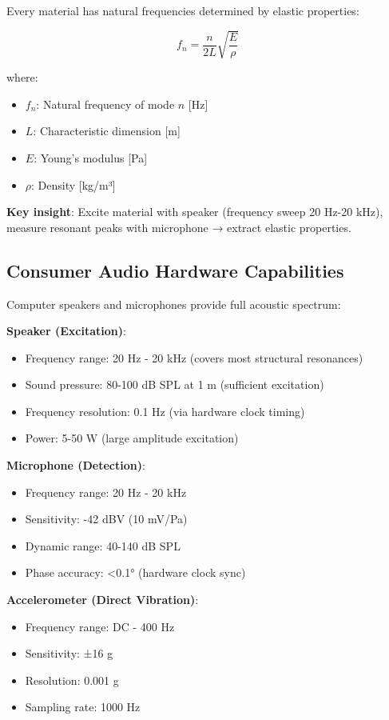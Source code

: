 \documentclass[12pt,a4paper]{article}
\begin{document}
Every material has natural frequencies determined by elastic properties:

\begin{equation}
f_n = \frac{n}{2L}\sqrt{\frac{E}{\rho}}
\end{equation}

where:
\begin{itemize}
\item $f_n$: Natural frequency of mode $n$ [Hz]
\item $L$: Characteristic dimension [m]
\item $E$: Young's modulus [Pa]
\item $\rho$: Density [kg/m³]
\end{itemize}

\textbf{Key insight}: Excite material with speaker (frequency sweep 20 Hz-20 kHz), measure resonant peaks with microphone → extract elastic properties.

\subsection{Consumer Audio Hardware Capabilities}

Computer speakers and microphones provide full acoustic spectrum:

\textbf{Speaker (Excitation)}:
\begin{itemize}
\item Frequency range: 20 Hz - 20 kHz (covers most structural resonances)
\item Sound pressure: 80-100 dB SPL at 1 m (sufficient excitation)
\item Frequency resolution: 0.1 Hz (via hardware clock timing)
\item Power: 5-50 W (large amplitude excitation)
\end{itemize}

\textbf{Microphone (Detection)}:
\begin{itemize}
\item Frequency range: 20 Hz - 20 kHz
\item Sensitivity: -42 dBV (10 mV/Pa)
\item Dynamic range: 40-140 dB SPL
\item Phase accuracy: <0.1° (hardware clock sync)
\end{itemize}

\textbf{Accelerometer (Direct Vibration)}:
\begin{itemize}
\item Frequency range: DC - 400 Hz
\item Sensitivity: ±16 g
\item Resolution: 0.001 g
\item Sampling rate: 1000 Hz
\end{itemize}
\end{document}
